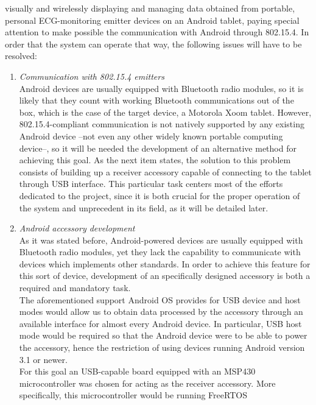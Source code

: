 		visually and wirelessly displaying and managing data obtained from portable, personal ECG-monitoring
		emitter devices on an Android tablet, paying special attention to make possible the communication
		with Android through 802.15.4. In order that the system can operate that way, the following 
		issues will have to be resolved:
		\begin{enumerate}
			\item \emph{Communication with 802.15.4 emitters}\\
				Android devices are usually equipped with Bluetooth radio modules, so it is likely that they 
				count with working Bluetooth communications out of the box, which is the case of the target
				device, a Motorola Xoom tablet.
				However, 802.15.4-compliant communication is not natively supported by any existing Android
				device --not even any other widely known portable computing device--, so it will be needed %
				the development of an alternative method for achieving this goal. As the next item states,
				the solution to this problem consists of building up a receiver accessory capable of connecting
				to the tablet through USB interface. This particular task centers most of the efforts dedicated
				to the project, since it is both crucial for the proper operation of the system and unprecedent
				in its field, as it will be detailed later.
			\item \emph{Android accessory development}\\
				As it was stated before, Android-powered devices are usually equipped with Bluetooth radio
				modules, yet they lack the capability to communicate with devices which implements other 
				standards. In order to achieve this feature for this sort of device, development of an
				specifically designed accessory is both a required and mandatory task.\\
				The aforementioned support Android OS provides for USB device and host modes would allow us to
				obtain data processed by the accessory through an available interface for almost every 
				Android device. In particular, USB host mode would be required so that the Android device 
				were to be able to power the accessory, hence the restriction of using devices running
				Android version 3.1 or newer.\\
				For this goal an USB-capable board equipped with an MSP430 microcontroller was chosen for acting
				as the receiver accessory. More specifically, this microcontroller would be running FreeRTOS

\end{enumerate}
